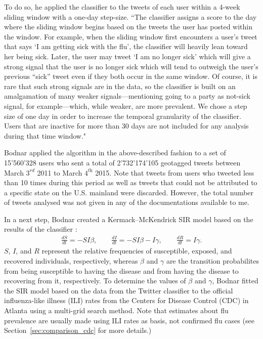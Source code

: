 \documentclass[11pt, a4paper,twoside]{report}\usepackage[]{graphicx}\usepackage[]{color}
\begin{document}
To do so, he applied the classifier to the tweets of each user within a 4-week sliding window with a one-day step-size. ``The classifier assigns a score to the day where the sliding window begins based on the tweets the user has posted within the window. For example, when the sliding window first encounters a user’s tweet that says `I am getting sick with the flu', the classifier will heavily lean toward her being sick. Later, the user may tweet `I am no longer sick' which will give a strong signal that the user is no longer sick which will tend to outweigh the user’s previous “sick” tweet even if they both occur in the same window. Of course, it is rare that such strong signals are in the data, so the classifier is built on an amalgamation of many weaker signals—mentioning going to a party as not-sick signal, for example---which, while weaker, are more prevalent. We chose a step size of one day in order to increase the temporal granularity of the classifier. Users that are inactive for more than 30 days are not included for any analysis during that time window."

Bodnar applied the algorithm in the above-described fashion to a set of 15'560'328 users who sent a total of 2'732'174'105 geotagged tweets between March $3^\textit{rd}$ 2011 to March $4^\textit{th}$ 2015. Note that tweets from users who tweeted less than 10 times during this period as well as tweets that could not be attributed to a specific state on the U.S. mainland were discarded. However, the total number of tweets analysed was not given in any of the documentations available to me. 

In a next step, Bodnar created a Kermack--McKendrick SIR model based on the results of the classifier \citep{martcheva2015introduction}:
\begin{align}
\frac{dS}{dt} = -SI\beta, \qquad \frac{dI}{dt} = -SI\beta - I\gamma, \qquad \frac{dR}{dt} = I\gamma.
\end{align}
$S$, $I$, and $R$ represent the relative frequencies of susceptible, exposed, and recovered individuals, respectively, whereas $\beta$ and $\gamma$ are the transition probabilites from being susceptible to having the disease and from having the disease to recovering from it, respectively. To determine the values of $\beta$ and $\gamma$, Bodnar fitted the SIR model based on the data from the Twitter classifier to the official influenza-like illness (ILI) rates from the Centers for Disease Control (CDC) in Atlanta using a multi-grid search method. Note that estimates about flu prevalence are usually made using ILI rates as basis, not confirmed flu cases (see Section~\ref{sec:comparison_cdc} for more details.)
\end{document}
